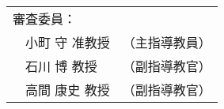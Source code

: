 \newpage
\thispagestyle{empty}
\vspace*{8cm}
\begin{center}


 \bigskip

 \jauthor
 \vspace*{0.4cm}
 \begin{table}[h]
 \begin{center}
	\begin{tabular}[t]{p{}ll}
	 \multicolumn{2}{l}{審査委員：} \\
	 & 小町 守 准教授 & （主指導教員） \\
	 & 石川 博 教授 & （副指導教官） \\
	 & 高間 康史 教授 & （副指導教官）
	\end{tabular}
 \end{center}
 \end{table}
 \end{center}
 
\newpage

